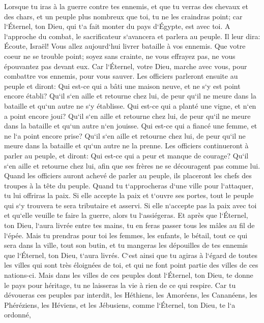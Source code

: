 \verse Lorsque tu iras à la guerre contre tes ennemis, et que tu verras des chevaux et des chars, et un peuple plus nombreux que toi, tu ne les craindras point; car l`Éternel, ton Dieu, qui t`a fait monter du pays d`Égypte, est avec toi. 
\verse A l`approche du combat, le sacrificateur s`avancera et parlera au peuple. 
\verse Il leur dira: Écoute, Israël! Vous allez aujourd`hui livrer bataille à vos ennemis. Que votre coeur ne se trouble point; soyez sans crainte, ne vous effrayez pas, ne vous épouvantez pas devant eux. 
\verse Car l`Éternel, votre Dieu, marche avec vous, pour combattre vos ennemis, pour vous sauver. 
\verse Les officiers parleront ensuite au peuple et diront: Qui est-ce qui a bâti une maison neuve, et ne s`y est point encore établi? Qu`il s`en aille et retourne chez lui, de peur qu`il ne meure dans la bataille et qu`un autre ne s`y établisse. 
\verse Qui est-ce qui a planté une vigne, et n`en a point encore joui? Qu`il s`en aille et retourne chez lui, de peur qu`il ne meure dans la bataille et qu`un autre n`en jouisse. 
\verse Qui est-ce qui a fiancé une femme, et ne l`a point encore prise? Qu`il s`en aille et retourne chez lui, de peur qu`il ne meure dans la bataille et qu`un autre ne la prenne. 
\verse Les officiers continueront à parler au peuple, et diront: Qui est-ce qui a peur et manque de courage? Qu`il s`en aille et retourne chez lui, afin que ses frères ne se découragent pas comme lui. 
\verse Quand les officiers auront achevé de parler au peuple, ils placeront les chefs des troupes à la tête du peuple. 
\verse Quand tu t`approcheras d`une ville pour l`attaquer, tu lui offriras la paix. 
\verse Si elle accepte la paix et t`ouvre ses portes, tout le peuple qui s`y trouvera te sera tributaire et asservi. 
\verse Si elle n`accepte pas la paix avec toi et qu`elle veuille te faire la guerre, alors tu l`assiégeras. 
\verse Et après que l`Éternel, ton Dieu, l`aura livrée entre tes mains, tu en feras passer tous les mâles au fil de l`épée. 
\verse Mais tu prendras pour toi les femmes, les enfants, le bétail, tout ce qui sera dans la ville, tout son butin, et tu mangeras les dépouilles de tes ennemis que l`Éternel, ton Dieu, t`aura livrés. 
\verse C`est ainsi que tu agiras à l`égard de toutes les villes qui sont très éloignées de toi, et qui ne font point partie des villes de ces nations-ci. 
\verse Mais dans les villes de ces peuples dont l`Éternel, ton Dieu, te donne le pays pour héritage, tu ne laisseras la vie à rien de ce qui respire. 
\verse Car tu dévoueras ces peuples par interdit, les Héthiens, les Amoréens, les Cananéens, les Phéréziens, les Héviens, et les Jébusiens, comme l`Éternel, ton Dieu, te l`a ordonné, 
